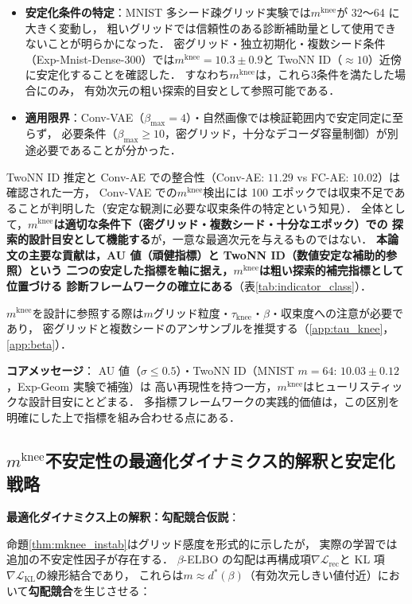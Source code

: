 \documentclass[11pt,a4paper]{jsarticle}
\newcommand{\mknee}{m^{\mathrm{knee}}}
\begin{document}
\begin{itemize}
  \item \textbf{安定化条件の特定}：MNIST 多シード疎グリッド実験では$\mknee$が 32〜64 に大きく変動し，
        粗いグリッドでは信頼性のある診断補助量として使用できないことが明らかになった．
        密グリッド・独立初期化・複数シード条件（Exp-Mnist-Dense-300）では$\mknee = 10.3 \pm 0.9$と
        TwoNN ID（$\approx 10$）近傍に安定化することを確認した．
        すなわち$\mknee$は，これら3条件を満たした場合にのみ，
        有効次元の粗い探索的目安として参照可能である．
  \item \textbf{適用限界}：Conv-VAE（$\beta_{\max}=4$）・自然画像では検証範囲内で安定同定に至らず，
        必要条件（$\beta_{\max} \geq 10$，密グリッド，十分なデコーダ容量制御）が別途必要であることが分かった．
\end{itemize}

TwoNN ID 推定と Conv-AE での整合性（Conv-AE: $11.29$ vs FC-AE: $10.02$）は確認された一方，
Conv-VAE での$\mknee$検出には 100 エポックでは収束不足であることが判明した（安定な観測に必要な収束条件の特定という知見）．
全体として，\textbf{$\mknee$は適切な条件下（密グリッド・複数シード・十分なエポック）での
探索的設計目安として機能する}が，一意な最適次元を与えるものではない．
\textbf{本論文の主要な貢献は，AU 値（頑健指標）と TwoNN ID（数値安定な補助的参照）という
二つの安定した指標を軸に据え，$\mknee$は粗い探索的補完指標として位置づける
診断フレームワークの確立にある}（表\ref{tab:indicator_class}）．

$\mknee$を設計に参照する際は$m$グリッド粒度・$\tau_\mathrm{knee}$・$\beta$・収束度への注意が必要であり，
密グリッドと複数シードのアンサンブルを推奨する（\ref{app:tau_knee}，\ref{app:beta}）．

\textbf{コアメッセージ}：
AU 値（$\sigma \leq 0.5$）・TwoNN ID（MNIST $m=64$: $10.03 \pm 0.12$，Exp-Geom 実験で補強）は
高い再現性を持つ一方，$\mknee$はヒューリスティックな設計目安にとどまる．
多指標フレームワークの実践的価値は，この区別を明確にした上で指標を組み合わせる点にある．

\subsection{$\mknee$不安定性の最適化ダイナミクス的解釈と安定化戦略}\label{sec:disc_mknee_improve}

\textbf{最適化ダイナミクス上の解釈：勾配競合仮説}：

命題\ref{thm:mknee_instab}はグリッド感度を形式的に示したが，
実際の学習では追加の不安定性因子が存在する．
$\beta$-ELBO の勾配は再構成項$\nabla\mathcal{L}_\mathrm{rec}$と
KL 項$\nabla\mathcal{L}_\mathrm{KL}$の線形結合であり，
これらは$m \approx d^*(\beta)$（有効次元しきい値付近）において\textbf{勾配競合}を生じさせる：
\end{document}
